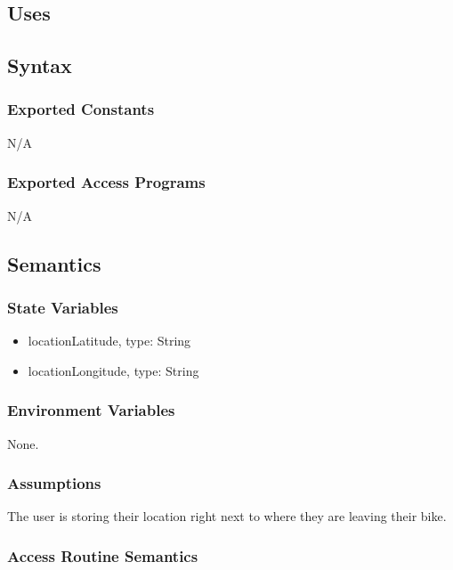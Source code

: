\documentclass[12pt, titlepage]{article}
\begin{document}
\subsection{Uses}


\subsection{Syntax}

\subsubsection{Exported Constants}

N/A

\subsubsection{Exported Access Programs}

N/A

\subsection{Semantics}

\subsubsection{State Variables}

\begin{itemize}
\item locationLatitude, type: String
\item locationLongitude, type: String
\end{itemize}


\subsubsection{Environment Variables}

None.


\subsubsection{Assumptions}

The user is storing their location right next to where they are leaving their bike. 

\subsubsection{Access Routine Semantics}
\end{document}
